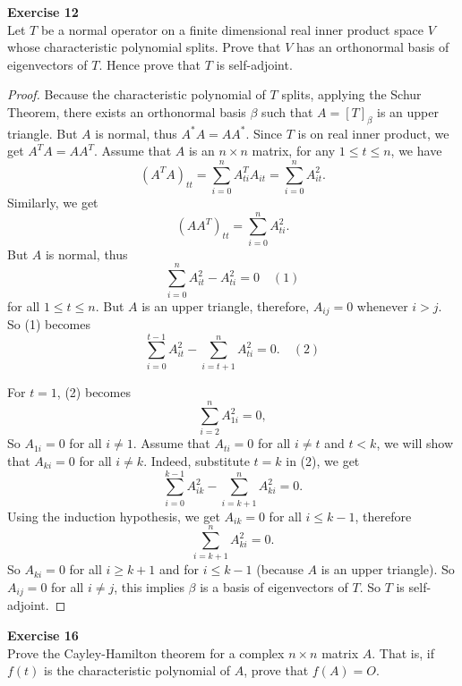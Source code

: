 \documentclass[12pt, a4paper]{article}
\theoremstyle{plain}
\newenvironment{exercise}[2][Exercise]
    { \begin{mdframed}[backgroundcolor=gray!20] \textbf{#1 #2} \\}
    {  \end{mdframed}}
\begin{document}
\begin{exercise}{12}
Let $T$ be a normal operator on a finite dimensional real inner product space $V$ whose characteristic polynomial splits. Prove that $V$ has an orthonormal basis of eigenvectors of $T$. Hence prove that $T$ is self-adjoint.
\end{exercise}
	\begin{proof}
	Because the characteristic polynomial of $T$ splits, applying the Schur Theorem, there exists an orthonormal basis $\beta$ such that $A = [T]_\beta$ is an upper triangle. But $A$ is normal, thus $A^*A=AA^*$. Since $T$ is on real inner product, we get $A^TA=AA^T$.  Assume that $A$ is an $n\times n$ matrix, for any $1\leq t \leq n$, we have
	\[
	(A^TA)_{tt}=\sum_{i=0}^{n}{A_{ti}^TA_{it}}=\sum_{i=0}^{n}{A_{it}^2}.
	\]
	Similarly, we get 
	\[
	(AA^T)_{tt}=\sum_{i=0}^{n}{A_{ti}^2}.
	\]
	But $A$ is normal, thus 
	\[
	\sum_{i=0}^{n}{A_{it}^2-A_{ti}^2}=0\quad (1)
	\]
	for all $1\leq t\leq n$. But $A$ is an upper triangle, therefore, $A_{ij}=0$ whenever $i>j$. So (1) becomes
	\[
	\sum_{i=0}^{t-1}{A_{it}^2}-\sum_{i=t+1}^{n}{A_{ti}^2}=0.\quad (2)
	\]
	
	For $t=1$, (2) becomes
	\[
	\sum_{i=2}^{n}{A_{1i}^2}=0,
	\]
	So $A_{1i} =0$ for all $i\neq 1$. Assume that $A_{ti}=0$ for all $i\neq t$ and $t< k$, we will show that $A_{ki}=0$ for all $i\neq k$. Indeed, substitute $t=k$ in (2), we get
	\[
	\sum_{i=0}^{k-1}{A_{ik}^2}-\sum_{i=k+1}^{n}{A_{ki}^2}=0.
	\]
	Using the induction hypothesis, we get $A_{ik}=0$ for all $i\leq k-1$, therefore
	\[
	\sum_{i=k+1}^{n}{A_{ki}^2}=0.
	\]
	So $A_{ki}  = 0$ for all $i\geq k+1$ and for $i \leq k-1$ (because $A$ is an upper triangle). So $A_{ij} = 0$ for all $i\neq j$, this implies $\beta$ is a basis of eigenvectors of $T$. So $T$ is self-adjoint.
	\end{proof}
\begin{exercise}{16}
Prove the Cayley-Hamilton theorem for a complex $n\times n$ matrix $A$. That is, if $f(t)$ is the characteristic polynomial of $A$, prove that $f(A)=O$. 
\end{exercise}
\end{document}
